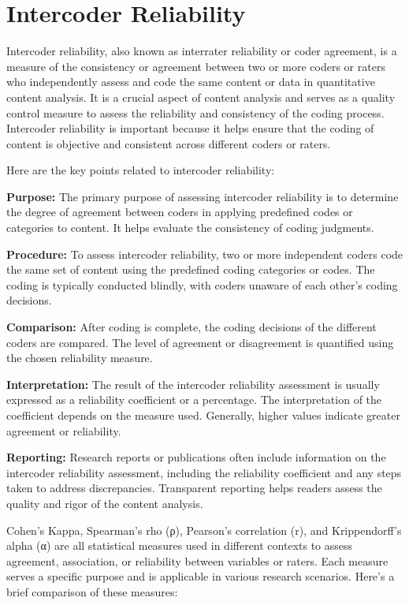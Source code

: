 \documentclass[
  b5paper]{book}
\begin{document}
\hypertarget{intercoder-reliability-1}{%
\section{Intercoder Reliability}\label{intercoder-reliability-1}}

Intercoder reliability, also known as interrater reliability or coder agreement, is a measure of the consistency or agreement between two or more coders or raters who independently assess and code the same content or data in quantitative content analysis. It is a crucial aspect of content analysis and serves as a quality control measure to assess the reliability and consistency of the coding process. Intercoder reliability is important because it helps ensure that the coding of content is objective and consistent across different coders or raters.

Here are the key points related to intercoder reliability:

\textbf{Purpose:} The primary purpose of assessing intercoder reliability is to determine the degree of agreement between coders in applying predefined codes or categories to content. It helps evaluate the consistency of coding judgments.

\textbf{Procedure:} To assess intercoder reliability, two or more independent coders code the same set of content using the predefined coding categories or codes. The coding is typically conducted blindly, with coders unaware of each other's coding decisions.

\textbf{Comparison:} After coding is complete, the coding decisions of the different coders are compared. The level of agreement or disagreement is quantified using the chosen reliability measure.

\textbf{Interpretation:} The result of the intercoder reliability assessment is usually expressed as a reliability coefficient or a percentage. The interpretation of the coefficient depends on the measure used. Generally, higher values indicate greater agreement or reliability.

\textbf{Reporting:} Research reports or publications often include information on the intercoder reliability assessment, including the reliability coefficient and any steps taken to address discrepancies. Transparent reporting helps readers assess the quality and rigor of the content analysis.

Cohen's Kappa, Spearman's rho (ρ), Pearson's correlation (r), and Krippendorff's alpha (α) are all statistical measures used in different contexts to assess agreement, association, or reliability between variables or raters. Each measure serves a specific purpose and is applicable in various research scenarios. Here's a brief comparison of these measures:
\end{document}
